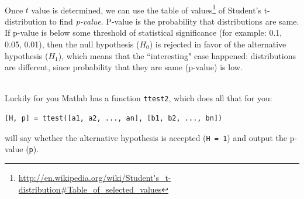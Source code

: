 \documentclass[a4paper,11pt]{article}
\begin{document}
\ \\
Once $t$ value is determined, we can use the table of values\footnote{\url{http://en.wikipedia.org/wiki/Student's_t-distribution\#Table_of_selected_values}} of Student's t-distribution to find \emph{p-value}. P-value is the probability that distributions are same. If p-value is below some threshold of statistical significance (for example: 0.1, 0.05, 0.01), then the null hypothesis ($H_0$) is rejected in favor of the alternative hypothesis ($H_1$), which means that the ``interesting" case happened: distributions are different, since probability that they are same (p-value) is low.

\ \\
Luckily for you Matlab has a function \texttt{ttest2}, which does all that for you:
\begin{verbatim}
[H, p] = ttest([a1, a2, ..., an], [b1, b2, ..., bn])
\end{verbatim}
will say whether the alternative hypothesis is accepted (\texttt{H = 1}) and output the p-value (\texttt{p}).
\end{document}
